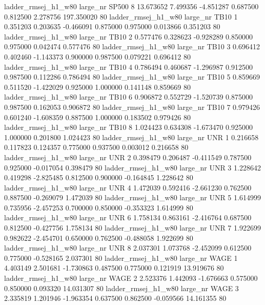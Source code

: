 ladder_rmsej_h1_w80   large_nr    SP500                 8 13.673652  7.499356  -4.851287 0.687500 0.812500  2.278756  197.350020 80
ladder_rmsej_h1_w80   large_nr     TB10                 1  0.351203  0.203635  -0.466091 0.875000 0.975000  0.013866    0.351203 80
ladder_rmsej_h1_w80   large_nr     TB10                 2  0.577476  0.328623  -0.928289 0.850000 0.975000  0.042474    0.577476 80
ladder_rmsej_h1_w80   large_nr     TB10                 3  0.696412  0.402460  -1.143373 0.900000 0.987500  0.079221    0.696412 80
ladder_rmsej_h1_w80   large_nr     TB10                 4  0.786494  0.460687  -1.296987 0.912500 0.987500  0.112286    0.786494 80
ladder_rmsej_h1_w80   large_nr     TB10                 5  0.859669  0.511520  -1.422029 0.925000 1.000000  0.141148    0.859669 80
ladder_rmsej_h1_w80   large_nr     TB10                 6  0.906872  0.552729  -1.520739 0.875000 0.987500  0.162053    0.906872 80
ladder_rmsej_h1_w80   large_nr     TB10                 7  0.979426  0.601240  -1.608359 0.887500 1.000000  0.183502    0.979426 80
ladder_rmsej_h1_w80   large_nr     TB10                 8  1.024423  0.634308  -1.673470 0.925000 1.000000  0.201800    1.024423 80
ladder_rmsej_h1_w80   large_nr      UNR                 1  0.216658  0.117823   0.124357 0.775000 0.937500  0.003012    0.216658 80
ladder_rmsej_h1_w80   large_nr      UNR                 2  0.398479  0.206487  -0.411549 0.787500 0.925000 -0.017054    0.398479 80
ladder_rmsej_h1_w80   large_nr      UNR                 3  1.228642  0.419298  -2.825485 0.812500 0.900000 -0.164845    1.228642 80
ladder_rmsej_h1_w80   large_nr      UNR                 4  1.472039  0.592416  -2.661230 0.762500 0.887500 -0.269079    1.472039 80
ladder_rmsej_h1_w80   large_nr      UNR                 5  1.614999  0.735956  -2.457253 0.700000 0.850000 -0.353323    1.614999 80
ladder_rmsej_h1_w80   large_nr      UNR                 6  1.758134  0.863161  -2.416764 0.687500 0.812500 -0.427756    1.758134 80
ladder_rmsej_h1_w80   large_nr      UNR                 7  1.922699  0.982622  -2.454701 0.650000 0.762500 -0.488058    1.922699 80
ladder_rmsej_h1_w80   large_nr      UNR                 8  2.037301  1.073768  -2.452099 0.612500 0.775000 -0.528165    2.037301 80
ladder_rmsej_h1_w80   large_nr     WAGE                 1  4.403149  2.501681  -1.730863 0.487500 0.775000  0.121919   13.919676 80
ladder_rmsej_h1_w80   large_nr     WAGE                 2  2.523376  1.442093  -1.676663 0.575000 0.850000  0.093320   14.031307 80
ladder_rmsej_h1_w80   large_nr     WAGE                 3  2.335819  1.201946  -1.963354 0.637500 0.862500 -0.059566   14.161355 80
